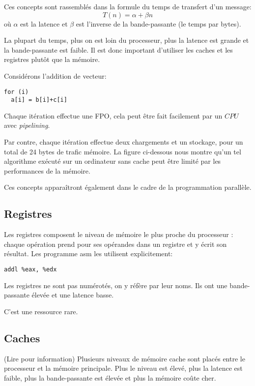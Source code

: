 Ces concepts sont rassemblés dans la formule du temps de transfert d'un message:
\begin{equation}
T(n) = \alpha + \beta n
\end{equation}
où $\alpha$ est la latence et $\beta$ est l'inverse de la bande-passante (le temps par bytes).

La plupart du temps, plus on est loin du processeur, plus la latence est grande et la bande-passante est faible. Il est donc important d'utiliser les caches et les registres plutôt que la mémoire.

Considérons l'addition de vecteur:
\begin{verbatim}
for (i)
  a[i] = b[i]+c[i]
\end{verbatim}
Chaque itération effectue une FPO, cela peut être fait facilement par un $CPU$ avec \textit{pipelining}.

Par contre, chaque itération effectue deux chargements et un stockage, pour un total de 24 bytes de trafic mémoire.
La figure ci-dessous nous montre qu'un tel algorithme exécuté sur un ordinateur sans cache peut être limité par les performances de la mémoire.


Ces concepts apparaîtront également dans le cadre de la programmation parallèle.
	
	\subsection{Registres}

Les registres composent le niveau de mémoire le plus proche du processeur : chaque opération prend pour ses opérandes dans un registre et y écrit son résultat. Les programme asm les utilisent explicitement:
\begin{verbatim}
addl %eax, %edx
\end{verbatim}
Les registres ne sont pas numérotés, on y réfère par leur noms. Ils ont une bande-passante élevée et une latence basse.

C'est une ressource rare.

	\subsection{Caches}
	
	(Lire pour information) Plusieurs niveaux de mémoire cache sont placés entre le processeur et la mémoire principale. Plus le niveau est élevé, plus la latence est faible, plus la bande-passante est élevée et plus la mémoire coûte cher.
	
